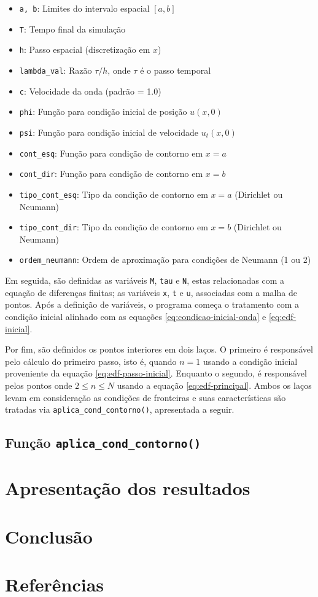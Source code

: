 \documentclass[column,amsmath,amssymb,floatfix]{revtex4}
\begin{document}
 \begin{itemize}
   \item \texttt{a, b}: Limites do intervalo espacial $[a,b]$
   \item \texttt{T}: Tempo final da simulação
   \item \texttt{h}: Passo espacial (discretização em $x$)
   \item \texttt{lambda\_val}: Razão $\tau/h$, onde $\tau$ é o passo temporal 
   \item \texttt{c}: Velocidade da onda (padrão = 1.0)
   \item \texttt{phi}: Função para condição inicial de posição $u(x,0)$
   \item \texttt{psi}: Função para condição inicial de velocidade $u_t(x,0)$
   \item \texttt{cont\_esq}: Função para condição de contorno em $x=a$
   \item \texttt{cont\_dir}: Função para condição de contorno em $x=b$
   \item \texttt{tipo\_cont\_esq}: Tipo da condição de contorno em $x=a$ (Dirichlet ou Neumann)
   \item \texttt{tipo\_cont\_dir}: Tipo da condição de contorno em $x=b$ (Dirichlet ou Neumann)
   \item \texttt{ordem\_neumann}: Ordem de aproximação para condições de Neumann (1 ou 2)
\end{itemize}

Em seguida, são definidas as variáveis \texttt{M}, \texttt{tau} e \texttt{N}, estas relacionadas com a equação de diferenças finitas; as variáveis \texttt{x}, \texttt{t} e \texttt{u}, associadas com a malha de pontos. Após a definição de variáveis, o programa começa o tratamento com a condição inicial alinhado com as equações \eqref{eq:condicao-inicial-onda} e \eqref{eq:edf-inicial}.

Por fim, são definidos os pontos interiores em dois laços. O primeiro é responsável pelo cálculo do primeiro passo, isto é, quando $n=1$ usando a condição inicial proveniente da equação \eqref{eq:edf-passo-inicial}. Enquanto o segundo, é responsável pelos pontos onde $2 \leq n \leq N$ usando a equação \eqref{eq:edf-principal}. Ambos os laços levam em consideração as condições de fronteiras e suas características são tratadas via \texttt{aplica\_cond\_contorno()}, apresentada a seguir.

\subsection{Função \texttt{aplica\_cond\_contorno()}}
        

\section{Apresentação dos resultados}

\section{Conclusão}
\section{Referências}
\end{document}

